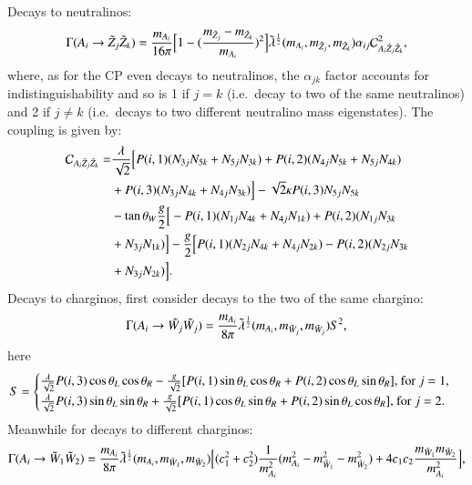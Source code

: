 \documentclass[final,3p,times]{elsarticle}
\begin{document}
Decays to neutralinos:
\begin{equation} \label{AneutneutNMSSM}
\Gamma(A_i \rightarrow \tilde{Z}_j \tilde{Z}_k) = {m_{A_i} \over 16 \pi} \Big[1 - ({m_{\tilde{Z}_j} - m_{\tilde{Z}_k} \over m_{A_i}})^2\Big] \tilde{\lambda}^{1 \over 2}(m_{A_i},m_{\tilde{Z}_j}, m_{\tilde{Z}_k}) \alpha_{ij} \mathcal{C}_{A_i \tilde{Z}_j \tilde{Z}_k}^2,
\end{equation}
where, as for the CP even decays to neutralinos, the $\alpha_{jk}$ factor accounts for indistinguishability and so is 1 if $j=k$ (i.e.\ decay to two of the same neutralinos) and 2 if $j\neq k$ (i.e.\ decays to two different neutralino mass eigenstates).
The coupling is given by:
\begin{equation}
\begin{aligned}
\mathcal{C}_{A_i \tilde{Z}_j \tilde{Z}_k} = & {\lambda \over \sqrt{2}}\Big[P(i,1)(N_{3j}N_{5k} + N_{5j}N_{3k}) + P(i,2)(N_{4j}N_{5k} + N_{5j}N_{4k}) \\ & + P(i,3)(N_{3j}N_{4k} + N_{4j}N_{3k})\Big] - \sqrt{2}\kappa P(i,3)N_{5j}N_{5k} \\ & - \tan\theta_W {g \over 2}\Big[-P(i,1)(N_{1j}N_{4k} + N_{4j}N_{1k}) + P(i,2)(N_{1j}N_{3k} \\ & + N_{3j}N_{1k})\Big] - {g \over 2}\Big[P(i,1)(N_{2j}N_{4k} + N_{4j}N_{2k}) - P(i,2)(N_{2j}N_{3k} \\ & + N_{3j}N_{2k})\Big].
\end{aligned}
\end{equation}
Decays to charginos, first consider decays to the two of the same chargino:
\begin{equation} \label{AchchNMSSM}
\Gamma(A_i \rightarrow \tilde{W_{j}} \tilde{W_{j}}) = {m_{A_i} \over 8 \pi} \tilde{\lambda}^{1 \over 2}(m_{A_i},m_{\tilde{W}_j}, m_{\tilde{W}_j}) S^2,
\end{equation}
here
\begin{equation}
S = \begin{cases}
	{\lambda \over \sqrt{2}}P(i,3)\cos\theta_L \cos\theta_R - {g \over \sqrt{2}}[P(i,1)\sin\theta_L \cos \theta_R + P(i,2) \cos\theta_L \sin\theta_R] $, for $j=1, \\
	{\lambda \over \sqrt{2}}P(i,3)\sin\theta_L \sin\theta_R + {g \over \sqrt{2}}[P(i,1)\cos\theta_L \sin \theta_R + P(i,2) \sin\theta_L \cos\theta_R] $, for $j=2. \\
	\end{cases}
\end{equation}
Meanwhile for decays to different charginos:
\begin{equation} \label{Ach1ch2NMSSM}
\Gamma(A_i \rightarrow \tilde{W}_1 \tilde{W}_2) = {m_{A_i} \over 8 \pi} \tilde{\lambda}^{1 \over 2}(m_{A_i},m_{\tilde{W}_1},m_{\tilde{W}_2})\Big[(c_{1}^2 + c_{2}^2){1 \over m_{A_i}^2}(m_{A_i}^2 - m_{\tilde{W}_1}^2 - m_{\tilde{W}_2}^2) + 4c_{1}c_{2}{m_{\tilde{W}_1}m_{\tilde{W}_2} \over m_{A_i}^2}\Big],
\end{equation}
\end{document}
